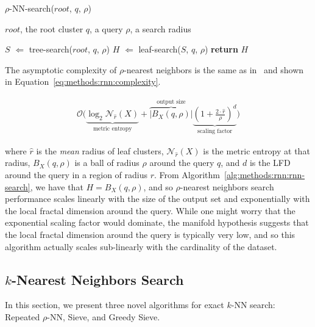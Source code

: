 \begin{algorithm} 
    \caption{$\rho$-NN-search($root$, $q$, $\rho$)} 
    \label{alg:methods:rnn:rnn-search} 
    \begin{algorithmic}
        \REQUIRE $root$, the root cluster
        \REQUIRE $q$, a query
        \REQUIRE $\rho$, a search radius

        \STATE $S$ $\Leftarrow$ tree-search($root$, $q$, $\rho$)
        \STATE $H$ $\Leftarrow$ leaf-search($S$, $q$, $\rho$)
        \STATE \textbf{return} $H$
    \end{algorithmic}
\end{algorithm}

The asymptotic complexity of $\rho$-nearest neighbors is the same as in~\cite{ishaq2019clustered} and shown in Equation~\ref{eq:methods:rnn:complexity}.

\begin{gather}
    \mathcal{O}
    \Bigg(
        \underbrace{\log_2 \mathcal{N}_{\hat{r}}(X)}_{\textrm{metric entropy}} +
        \overbrace{ \left| B_X(q, \rho) \right|}^{\textrm{output size}}
        \underbrace{ \left( 1 + \frac{2 \cdot \hat{r}}{ \rho} \right) ^ d}_{\textrm{scaling factor}}
    \Bigg)
    \label{eq:methods:rnn:complexity}
\end{gather}

where $\hat{r}$ is the \textit{mean} radius of leaf clusters, $\mathcal{N}_{\hat{r}}(X)$ is the metric entropy at that radius, $B_X(q, \rho)$ is a ball of radius $\rho$ around the query $q$, and $d$ is the LFD around the query in a region of radius $r$.
From Algorithm~\ref{alg:methods:rnn:rnn-search}, we have that $H = B_X(q, \rho)$, and so $\rho$-nearest neighbors search performance scales linearly with the size of the output set and exponentially with the local fractal dimension around the query.
While one might worry that the exponential scaling factor would dominate, the manifold hypothesis suggests that the local fractal dimension around the query is typically very low, and so this algorithm actually scales sub-linearly with the cardinality of the dataset.


\subsection{\texorpdfstring{$k$}{k}-Nearest Neighbors Search}
\label{subsec:methods:knn-search}

In this section, we present three novel algorithms for exact $k$-NN search:
Repeated $\rho$-NN, Sieve, and Greedy Sieve.


